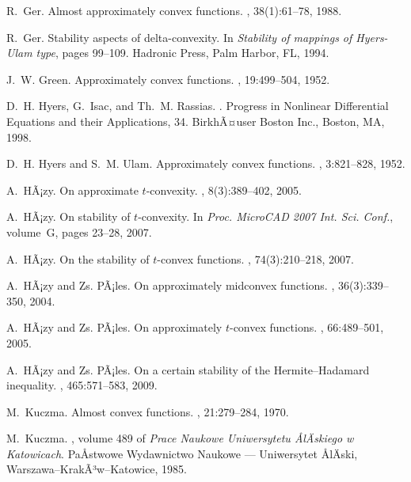 \documentclass[12pt,leqno]{amsart}
\theoremstyle{definition}
\begin{document}
\begin{thebibliography}{10}
R.~Ger.
\newblock Almost approximately convex functions.
, 38(1):61--78, 1988.

R.~Ger.
\newblock Stability aspects of delta-convexity.
\newblock In {\em Stability of mappings of Hyers-Ulam type}, pages 99--109.
  Hadronic Press, Palm Harbor, FL, 1994.

J.~W. Green.
\newblock Approximately convex functions.
, 19:499--504, 1952.

D.~H. Hyers, G.~Isac, and Th.~M. Rassias.
.
\newblock Progress in Nonlinear Differential Equations and their Applications,
  34. BirkhÃ¤user Boston Inc., Boston, MA, 1998.

D.~H. Hyers and S.~M. Ulam.
\newblock Approximately convex functions.
, 3:821--828, 1952.

A.~HÃ¡zy.
\newblock On approximate $t$-convexity.
, 8(3):389--402, 2005.

A.~HÃ¡zy.
\newblock On stability of $t$-convexity.
\newblock In {\em Proc. MicroCAD 2007 Int. Sci. Conf.}, volume~G, pages 23--28,
  2007.

A.~HÃ¡zy.
\newblock On the stability of $t$-convex functions.
, 74(3):210--218, 2007.

A.~HÃ¡zy and Zs. PÃ¡les.
\newblock On approximately midconvex functions.
, 36(3):339--350, 2004.

A.~HÃ¡zy and Zs. PÃ¡les.
\newblock On approximately $t$-convex functions.
, 66:489--501, 2005.

A.~HÃ¡zy and Zs. PÃ¡les.
\newblock On a certain stability of the {H}ermite--{H}adamard inequality.
, 465:571--583,
  2009.

M.~Kuczma.
\newblock Almost convex functions.
, 21:279--284, 1970.

M.~Kuczma.
, volume 489 of {\em Prace Naukowe Uniwersytetu
  ÅlÄskiego w Katowicach}.
\newblock PaÅstwowe Wydawnictwo Naukowe --- Uniwersytet ÅlÄski,
  Warszawa--KrakÃ³w--Katowice, 1985.


\end{thebibliography}
\end{document}
